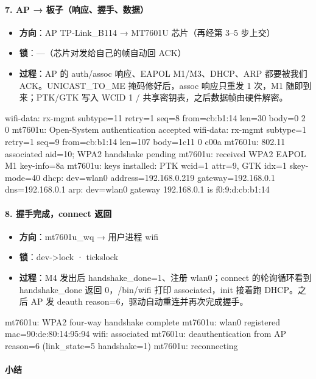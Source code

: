 \paragraph*{7. AP → 板子（响应、握手、数据）}
\begin{itemize}[leftmargin=2em,itemsep=1pt]
\item \textbf{方向}：AP TP-Link\_B114 → MT7601U 芯片（再经第 3–5 步上交）
\item \textbf{锁}：—（芯片对发给自己的帧自动回 ACK）
\item \textbf{过程}：AP 的 auth/assoc 响应、EAPOL M1/M3、DHCP、ARP 都要被我们 ACK。UNICAST\_TO\_ME 掩码修好后，assoc 响应只重发 1 次，M1 随即到来；PTK/GTK 写入 WCID 1 / 共享密钥表，之后数据帧由硬件解密。
\end{itemize}
\begin{dbglog}
wifi-data: rx-mgmt subtype=11 retry=1 seq=8 from=cb:b1:14 len=30 body=0 2 0
mt7601u: Open-System authentication accepted
wifi-data: rx-mgmt subtype=1 retry=1 seq=9 from=cb:b1:14 len=107 body=1c11 0 c00a
mt7601u: 802.11 associated aid=10; WPA2 handshake pending
mt7601u: received WPA2 EAPOL M1 key-info=8a
mt7601u: keys installed: PTK wcid=1 attr=9, GTK idx=1 skey-mode=40
dhcp: dev=wlan0 address=192.168.0.219 gateway=192.168.0.1 dns=192.168.0.1
arp: dev=wlan0 gateway 192.168.0.1 is f0:9:d:cb:b1:14
\end{dbglog}

\paragraph*{8. 握手完成，connect 返回}
\begin{itemize}[leftmargin=2em,itemsep=1pt]
\item \textbf{方向}：mt7601u\_wq → 用户进程 wifi
\item \textbf{锁}：dev->lock · tickslock
\item \textbf{过程}：M4 发出后 handshake\_done=1、注册 wlan0；connect 的轮询循环看到 handshake\_done 返回 0，/bin/wifi 打印 associated，init 接着跑 DHCP。之后 AP 发 deauth reason=6，驱动自动重连并再次完成握手。
\end{itemize}
\begin{dbglog}
mt7601u: WPA2 four-way handshake complete
mt7601u: wlan0 registered mac=90:de:80:14:95:94
wifi: associated
mt7601u: deauthentication from AP reason=6 (link_state=5 handshake=1)
mt7601u: reconnecting
\end{dbglog}

\paragraph*{小结}

